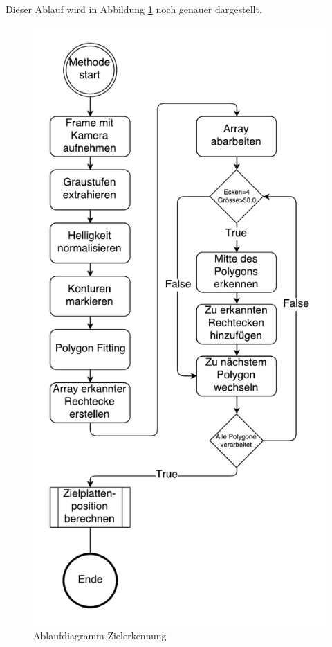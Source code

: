 \documentclass[a4paper]{report}
\begin{document}

Dieser Ablauf wird in Abbildung \ref{fig:ZielerkennungAblauf} noch genauer dargestellt.

\begin{figure}[h!]
	\centering
	\includegraphics[keepaspectratio,height=0.6\textheight]{ZielplatteErkennen}
	\caption{Ablaufdiagramm Zielerkennung}
	\label{fig:ZielerkennungAblauf}
\end{figure}
\end{document}

